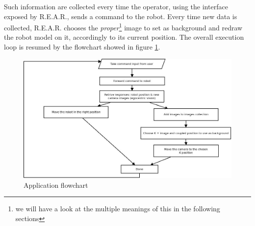 %
Such information are collected every time the operator, using the 
interface exposed by \textsf{R.E.A.R.}, sends a command to the robot. 
%
Every time new data is collected, \textsf{R.E.A.R.} chooses the 
\textit{proper}\footnote{we will have a look at the multiple meanings 
of this in the following sections} image to set as background 
and redraw the robot model on it, accordingly to its current position.
%
The overall execution loop is resumed by the flowchart showed 
in figure \ref{fig:overall_diagram}.
%
\begin{figure}[!h]
  \begin{center}
    \includegraphics[width=350pt]{img/overall_diagram.jpeg}  %
    \caption{Application flowchart}
    \label{fig:overall_diagram}
  \end{center}
\end{figure}
%
%

%


